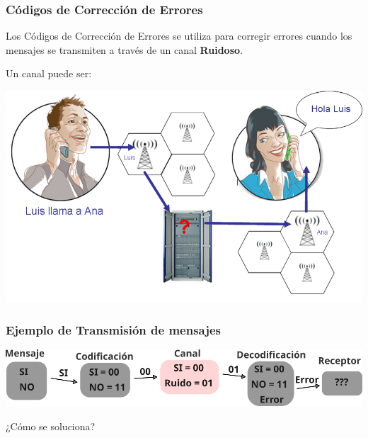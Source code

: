 \begin{frame}
	\frametitle{Códigos de Corrección de Errores}
	
	Los Códigos de Corrección de Errores se utiliza para corregir errores cuando los mensajes se transmiten a través de un canal \textbf{Ruidoso}. \vspace{0.5cm}
	
	Un canal puede ser:
	
	
	
{
	\centering
	
	\includegraphics[width=0.5\linewidth]{img/img1}

}	
\end{frame}

\begin{frame}
	\frametitle{Ejemplo de Transmisión de mensajes}
	
	
	{	
		
		\centering
		
		\includegraphics[width=0.7\linewidth]{img/img2}
		
		
	}


{

\huge

\centering

\vspace*{0.5cm} 
¿Cómo se soluciona?
	
}	
\end{frame}


